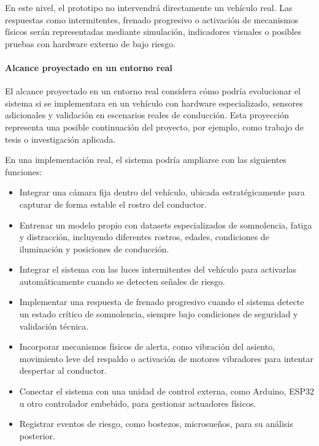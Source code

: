 \documentclass[conference]{IEEEtran}
\begin{document}
En este nivel, el prototipo no intervendrá directamente un vehículo real. Las respuestas como intermitentes, frenado progresivo o activación de mecanismos físicos serán representadas mediante simulación, indicadores visuales o posibles pruebas con hardware externo de bajo riesgo.

\paragraph{Alcance proyectado en un entorno real}

El alcance proyectado en un entorno real considera cómo podría evolucionar el sistema si se implementara en un vehículo con hardware especializado, sensores adicionales y validación en escenarios reales de conducción. Esta proyección representa una posible continuación del proyecto, por ejemplo, como trabajo de tesis o investigación aplicada.

En una implementación real, el sistema podría ampliarse con las siguientes funciones:

\begin{itemize}
    \item Integrar una cámara fija dentro del vehículo, ubicada estratégicamente para capturar de forma estable el rostro del conductor.
    
    \item Entrenar un modelo propio con datasets especializados de somnolencia, fatiga y distracción, incluyendo diferentes rostros, edades, condiciones de iluminación y posiciones de conducción.
    
    \item Integrar el sistema con las luces intermitentes del vehículo para activarlas automáticamente cuando se detecten señales de riesgo.
    
    \item Implementar una respuesta de frenado progresivo cuando el sistema detecte un estado crítico de somnolencia, siempre bajo condiciones de seguridad y validación técnica.
    
    \item Incorporar mecanismos físicos de alerta, como vibración del asiento, movimiento leve del respaldo o activación de motores vibradores para intentar despertar al conductor.
    
    \item Conectar el sistema con una unidad de control externa, como Arduino, ESP32 u otro controlador embebido, para gestionar actuadores físicos.
    
    \item Registrar eventos de riesgo, como bostezos, microsueños, para su análisis posterior.
    
\end{itemize}
\end{document}
